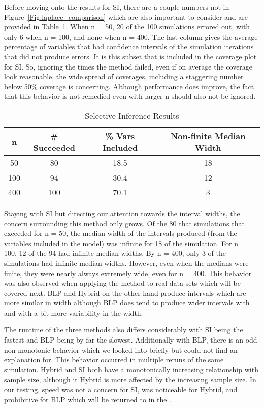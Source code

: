 Before moving onto the results for SI, there are a couple numbers not in Figure~\ref{Fig:laplace_comparison} which are also important to consider and are provided in Table~\ref{Tab:selective_inference}. When n = 50, 20 of the 100 simulations errored out, with only 6 when n = 100, and none when n = 400. The last column gives the average percentage of variables that had confidence intervals of the simulation iterations that did not produce errors. It is this subset that is included in the coverage plot for SI. So, ignoring the times the method failed, even if on average the coverage look reasonable, the wide spread of coverages, including a staggering number below 50\% coverage is concerning. Although performance does improve, the fact that this behavior is not remedied even with larger n should also not be ignored.

\begin{table}[ht]
  \centering
  \begin{tabular}{cccc}
  \hline
  n & \# Succeeded & \% Vars Included & Non-finite Median Width \\
  \hline
  50  & 80  & 18.5 & 18 \\
  100 & 94  & 30.4 & 12 \\
  400 & 100 & 70.1 & 3 \\
  \hline
  \end{tabular}
  \caption{Selective Inference Results}
  \label{Tab:selective_inference}
\end{table}

Staying with SI but directing our attention towards the interval widths, the concern surrounding this method only grows. Of the 80 that simulations that exceeded for n = 50, the median width of the intervals produced (from the variables included in the model) was infinite for 18 of the simulation. For n = 100, 12 of the 94 had infinite median widths. By n = 400, only 3 of the simulations had infinite median widths. However, even when the medians were finite, they were nearly always extremely wide, even for n = 400. This behavior was also observed when applying the method to real data sets which will be covered next. BLP and Hybrid on the other hand produce intervals which are more similar in width although BLP does tend to produce wider intervals with and with a bit more variability in the width.

The runtime of the three methods also differs considerably with SI being the fastest and BLP being by far the slowest. Additionally with BLP, there is an odd non-monotonic behavior which we looked into briefly but could not find an explanation for. This behavior occurred in multiple reruns of the same simulation. Hybrid and SI both have a monotonically increasing relationship with sample size, although it Hybrid is more affected by the increasing sample size. In our testing, speed was not a concern for SI, was noticeable for Hybrid, and prohibitive for BLP which will be returned to in the .

